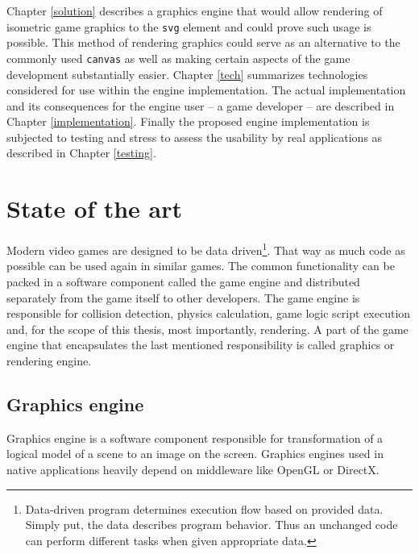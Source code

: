 \documentclass[11pt,oneside, final]{fithesis2}
\begin{document}
Chapter \ref{solution} describes a graphics engine that would allow rendering of isometric game graphics to the \texttt{svg} element and could prove such usage is possible. This method of rendering graphics could serve as an alternative to the commonly used \texttt{canvas} as well as making certain aspects of the game development substantially easier. Chapter \ref{tech} summarizes technologies considered for use within the engine implementation. The actual implementation and its consequences for the engine user -- a game developer -- are described in Chapter \ref{implementation}. Finally the proposed engine implementation is subjected to testing and stress to assess the usability by real applications as described in Chapter \ref{testing}.

\chapter{State of the art}
\label{theory}

Modern video games are designed to be data driven\footnote{Data-driven program determines execution flow based on provided data. Simply put, the data describes program behavior. Thus an unchanged code can perform different tasks when given appropriate data.\cite{charniak}}. That way as much code as possible can be used again in similar games. The common functionality can be packed in a software component called the game engine\cite{gregory} and distributed separately from the game itself to other developers. The game engine is responsible for collision detection, physics calculation, game logic script execution and, for the scope of this thesis, most importantly, rendering. A part of the game engine that encapsulates the last mentioned responsibility is called graphics or rendering engine.

\section{Graphics engine}
Graphics engine is a software component responsible for transformation of a logical model of a scene to an image on the screen. Graphics engines used in native applications heavily depend on middleware like OpenGL or DirectX\cite{gregory}.
\end{document}
